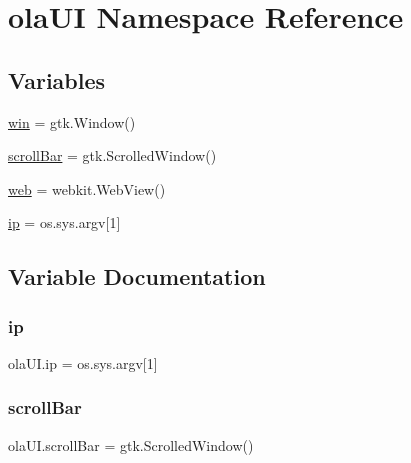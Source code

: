 \hypertarget{namespaceolaUI}{}\section{ola\+UI Namespace Reference}
\label{namespaceolaUI}
\subsection*{Variables}
\begin{DoxyCompactItemize}
\item 
\hyperlink{namespaceolaUI_a99a88a88414bc1bab55b329bd312ad76}{win} = gtk.\+Window()
\item 
\hyperlink{namespaceolaUI_a990ab1d4c8f6bdc16cffd8acb4f6be7b}{scroll\+Bar} = gtk.\+Scrolled\+Window()
\item 
\hyperlink{namespaceolaUI_a02fb6fdc4a5a894303b2c44d70971cc1}{web} = webkit.\+Web\+View()
\item 
\hyperlink{namespaceolaUI_a441ccce886b3119d7aec1d24ec8f25f7}{ip} = os.\+sys.\+argv\mbox{[}1\mbox{]}
\end{DoxyCompactItemize}


\subsection{Variable Documentation}
\mbox{\label{namespaceolaUI_a441ccce886b3119d7aec1d24ec8f25f7}} 
\subsubsection{\texorpdfstring{ip}{ip}}
{\footnotesize\ttfamily ola\+U\+I.\+ip = os.\+sys.\+argv\mbox{[}1\mbox{]}}

\mbox{\label{namespaceolaUI_a990ab1d4c8f6bdc16cffd8acb4f6be7b}} 
\subsubsection{\texorpdfstring{scroll\+Bar}{scrollBar}}
{\footnotesize\ttfamily ola\+U\+I.\+scroll\+Bar = gtk.\+Scrolled\+Window()}

\mbox{\label{namespaceolaUI_a02fb6fdc4a5a894303b2c44d70971cc1}} 
